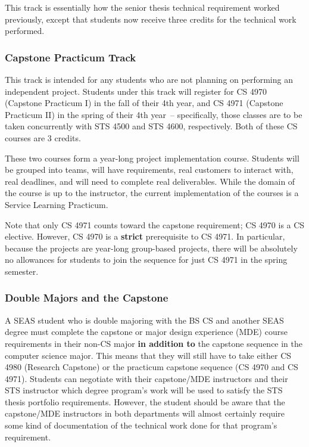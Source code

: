 This track is essentially how the senior thesis technical requirement
worked previously, except that students now receive three credits for
the technical work performed.

\subsubsection{Capstone Practicum Track}

This track is intended for any students who are not planning on
performing an independent project.  Students under this track will
register for CS 4970 (Capstone Practicum I) in the fall of their 4th
year, and CS 4971 (Capstone Practicum II) in the spring of their 4th
year~-- specifically, those classes are to be taken concurrently with
STS 4500 and STS 4600, respectively.  Both of these CS courses are 3
credits.

These two courses form a year-long project implementation course.
Students will be grouped into teams, will have requirements, real
customers to interact with, real deadlines, and will need to complete
real deliverables.  While the domain of the course is up to the
instructor, the current implementation of the courses is a Service
Learning Practicum.

Note that only CS 4971 counts toward the capstone requirement; CS 4970
is a CS elective.  However, CS 4970 is a {\bf strict} prerequisite to
CS 4971.  In particular, because the projects are year-long
group-based projects, there will be absolutely no allowances for
students to join the sequence for just CS 4971 in the spring semester.


\subsubsection{Double Majors and the Capstone}

A SEAS student who is double majoring with the BS CS and another SEAS
degree must complete the capstone or major design experience (MDE)
course requirements in their non-CS major {\bf in addition to} the
capstone sequence in the computer science major.  This means that they
will still have to take either CS 4980 (Research Capstone) or the
practicum capstone sequence (CS 4970 and CS 4971). Students can
negotiate with their capstone/MDE instructors and their STS instructor
which degree program's work will be used to satisfy the STS thesis
portfolio requirements. However, the student should be aware that the
capstone/MDE instructors in both departments will almost certainly
require some kind of documentation of the technical work done for that
program's requirement.



